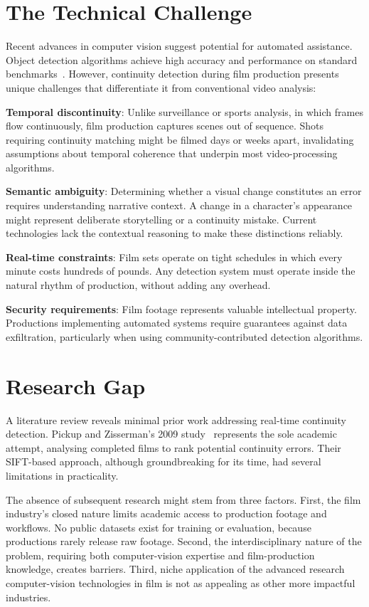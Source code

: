 \section{The Technical Challenge}
\label{sec:technical_challenge}

Recent advances in computer vision suggest potential for automated assistance. Object detection algorithms achieve high accuracy and performance on standard benchmarks~\cite{tsirtsakis2025}. However, continuity detection during film production presents unique challenges that differentiate it from conventional video analysis:

\textbf{Temporal discontinuity}: Unlike surveillance or sports analysis, in which frames flow continuously, film production captures scenes out of sequence. Shots requiring continuity matching might be filmed days or weeks apart, invalidating assumptions about temporal coherence that underpin most video-processing algorithms.

\textbf{Semantic ambiguity}: Determining whether a visual change constitutes an error requires understanding narrative context. A change in a character's appearance might represent deliberate storytelling or a continuity mistake. Current technologies lack the contextual reasoning to make these distinctions reliably.

\textbf{Real-time constraints}: Film sets operate on tight schedules in which every minute costs hundreds of pounds. Any detection system must operate inside the natural rhythm of production, without adding any overhead.

\textbf{Security requirements}: Film footage represents valuable intellectual property. Productions implementing automated systems require guarantees against data exfiltration, particularly when using community-contributed detection algorithms.

\section{Research Gap}
\label{sec:research_gap}

A literature review reveals minimal prior work addressing real-time continuity detection. Pickup and Zisserman's 2009 study~\cite{pickup2009} represents the sole academic attempt, analysing completed films to rank potential continuity errors. Their SIFT-based approach, although groundbreaking for its time, had several limitations in practicality.

The absence of subsequent research might stem from three factors. First, the film industry's closed nature limits academic access to production footage and workflows. No public datasets exist for training or evaluation, because productions rarely release raw footage. Second, the interdisciplinary nature of the problem, requiring both computer-vision expertise and film-production knowledge, creates barriers. Third, niche application of the advanced research computer-vision technologies in film is not as appealing as other more impactful industries.

